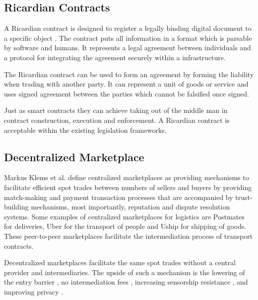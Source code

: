 \subsection{Ricardian Contracts}

A Ricardian contract is designed to register a legally binding digital document to a specific object \cite{grigg2004ricardian}. The contract puts all information in a format which is parsable by software and humans. It represents a legal agreement between individuals and a protocol for integrating the agreement securely within a infrastructure. \par
The Ricardian contract can be used to form an agreement by forming the liability when trading with another party. It can represent a unit of goods or service and uses signed agreement between the parties which cannot be falsified once signed. \par
Just as smart contracts \cite{sc} they can achieve taking out of the middle man in contract construction, execution and enforcement. A Ricardian contract is acceptable within the existing legislation frameworks.

\subsection{Decentralized Marketplace}

Markus Klems et al. define centralized marketplaces\cite{trustlessIntermediationInBCServiceMarket} as providing mechanisms to facilitate efficient spot trades between numbers of sellers and buyers by providing match-making and payment transaction processes that are accompanied by trust-building mechanisms, most importantly, reputation and dispute resolution systems. Some examples of centralized marketplaces for logistics are Postmates for deliveries, Uber for the transport of people and Uship for shipping of goods. These peer-to-peer marketplaces facilitate the intermediation process of transport contracts.\par
Decentralized marketplaces facilitate the same spot trades without a central provider and intermediaries. The upside of such a mechanism is the lowering of the entry barrier \cite{einav2016peer}, no intermediation fees \cite{openbazaar}, increasing sensorship resistance \cite{decentralMarket}, and improving privacy \cite{decentralizedAnonymousReputation}.
